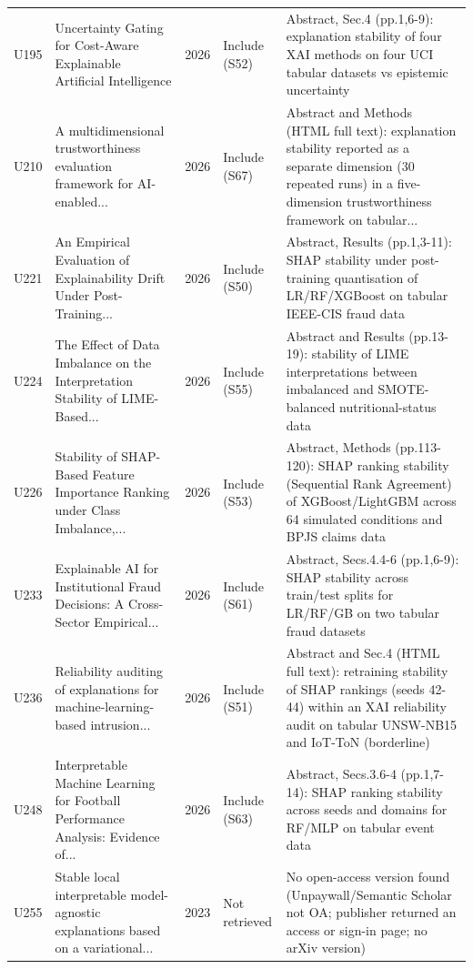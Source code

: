 \begin{longtable}{@{}P{1.0cm}P{6.3cm}P{0.7cm}P{1.6cm}P{6.1cm}@{}}
U195 & Uncertainty Gating for Cost-Aware Explainable Artificial Intelligence & 2026 & Include (S52) & Abstract, Sec.4 (pp.1,6-9): explanation stability of four XAI methods on four UCI tabular datasets vs epistemic uncertainty \\
U210 & A multidimensional trustworthiness evaluation framework for AI-enabled... & 2026 & Include (S67) & Abstract and Methods (HTML full text): explanation stability reported as a separate dimension (30 repeated runs) in a five-dimension trustworthiness framework on tabular... \\
U221 & An Empirical Evaluation of Explainability Drift Under Post-Training... & 2026 & Include (S50) & Abstract, Results (pp.1,3-11): SHAP stability under post-training quantisation of LR/\allowbreak{}RF/\allowbreak{}XGBoost on tabular IEEE-CIS fraud data \\
U224 & The Effect of Data Imbalance on the Interpretation Stability of LIME-Based... & 2026 & Include (S55) & Abstract and Results (pp.13-19): stability of LIME interpretations between imbalanced and SMOTE-balanced nutritional-status data \\
U226 & Stability of SHAP-Based Feature Importance Ranking under Class Imbalance,... & 2026 & Include (S53) & Abstract, Methods (pp.113-120): SHAP ranking stability (Sequential Rank Agreement) of XGBoost/\allowbreak{}LightGBM across 64 simulated conditions and BPJS claims data \\
U233 & Explainable AI for Institutional Fraud Decisions: A Cross-Sector Empirical... & 2026 & Include (S61) & Abstract, Secs.4.4-6 (pp.1,6-9): SHAP stability across train/\allowbreak{}test splits for LR/\allowbreak{}RF/\allowbreak{}GB on two tabular fraud datasets \\
U236 & Reliability auditing of explanations for machine-learning-based intrusion... & 2026 & Include (S51) & Abstract and Sec.4 (HTML full text): retraining stability of SHAP rankings (seeds 42-44) within an XAI reliability audit on tabular UNSW-NB15 and IoT-ToN (borderline) \\
U248 & Interpretable Machine Learning for Football Performance Analysis: Evidence of... & 2026 & Include (S63) & Abstract, Secs.3.6-4 (pp.1,7-14): SHAP ranking stability across seeds and domains for RF/\allowbreak{}MLP on tabular event data \\
U255 & Stable local interpretable model-agnostic explanations based on a variational... & 2023 & Not retrieved & No open-access version found (Unpaywall/\allowbreak{}Semantic Scholar not OA; publisher returned an access or sign-in page; no arXiv version) \\

\end{longtable}
